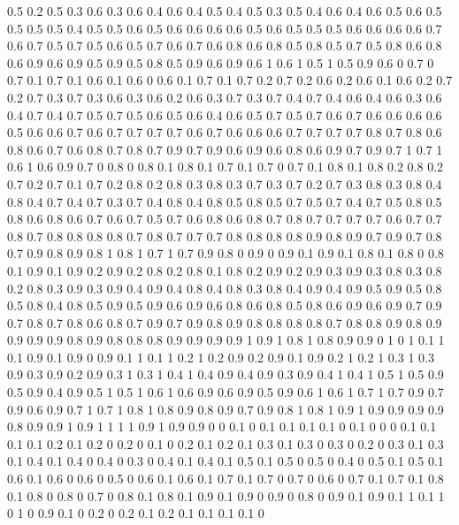 0.5 0.2
0.5 0.3
0.6 0.3
0.6 0.4
0.6 0.4
0.5 0.4
0.5 0.3
0.5 0.4
0.6 0.4
0.6 0.5
0.6 0.5
0.5 0.5
0.5 0.4
0.5 0.5
0.6 0.5
0.6 0.6
0.6 0.6
0.5 0.6
0.5 0.5
0.5 0.6
0.6 0.6
0.6 0.7
0.6 0.7
0.5 0.7
0.5 0.6
0.5 0.7
0.6 0.7
0.6 0.8
0.6 0.8
0.5 0.8
0.5 0.7
0.5 0.8
0.6 0.8
0.6 0.9
0.6 0.9
0.5 0.9
0.5 0.8
0.5 0.9
0.6 0.9
0.6 1
0.6 1
0.5 1
0.5 0.9
0.6 0
0.7 0
0.7 0.1
0.7 0.1
0.6 0.1
0.6 0
0.6 0.1
0.7 0.1
0.7 0.2
0.7 0.2
0.6 0.2
0.6 0.1
0.6 0.2
0.7 0.2
0.7 0.3
0.7 0.3
0.6 0.3
0.6 0.2
0.6 0.3
0.7 0.3
0.7 0.4
0.7 0.4
0.6 0.4
0.6 0.3
0.6 0.4
0.7 0.4
0.7 0.5
0.7 0.5
0.6 0.5
0.6 0.4
0.6 0.5
0.7 0.5
0.7 0.6
0.7 0.6
0.6 0.6
0.6 0.5
0.6 0.6
0.7 0.6
0.7 0.7
0.7 0.7
0.6 0.7
0.6 0.6
0.6 0.7
0.7 0.7
0.7 0.8
0.7 0.8
0.6 0.8
0.6 0.7
0.6 0.8
0.7 0.8
0.7 0.9
0.7 0.9
0.6 0.9
0.6 0.8
0.6 0.9
0.7 0.9
0.7 1
0.7 1
0.6 1
0.6 0.9
0.7 0
0.8 0
0.8 0.1
0.8 0.1
0.7 0.1
0.7 0
0.7 0.1
0.8 0.1
0.8 0.2
0.8 0.2
0.7 0.2
0.7 0.1
0.7 0.2
0.8 0.2
0.8 0.3
0.8 0.3
0.7 0.3
0.7 0.2
0.7 0.3
0.8 0.3
0.8 0.4
0.8 0.4
0.7 0.4
0.7 0.3
0.7 0.4
0.8 0.4
0.8 0.5
0.8 0.5
0.7 0.5
0.7 0.4
0.7 0.5
0.8 0.5
0.8 0.6
0.8 0.6
0.7 0.6
0.7 0.5
0.7 0.6
0.8 0.6
0.8 0.7
0.8 0.7
0.7 0.7
0.7 0.6
0.7 0.7
0.8 0.7
0.8 0.8
0.8 0.8
0.7 0.8
0.7 0.7
0.7 0.8
0.8 0.8
0.8 0.9
0.8 0.9
0.7 0.9
0.7 0.8
0.7 0.9
0.8 0.9
0.8 1
0.8 1
0.7 1
0.7 0.9
0.8 0
0.9 0
0.9 0.1
0.9 0.1
0.8 0.1
0.8 0
0.8 0.1
0.9 0.1
0.9 0.2
0.9 0.2
0.8 0.2
0.8 0.1
0.8 0.2
0.9 0.2
0.9 0.3
0.9 0.3
0.8 0.3
0.8 0.2
0.8 0.3
0.9 0.3
0.9 0.4
0.9 0.4
0.8 0.4
0.8 0.3
0.8 0.4
0.9 0.4
0.9 0.5
0.9 0.5
0.8 0.5
0.8 0.4
0.8 0.5
0.9 0.5
0.9 0.6
0.9 0.6
0.8 0.6
0.8 0.5
0.8 0.6
0.9 0.6
0.9 0.7
0.9 0.7
0.8 0.7
0.8 0.6
0.8 0.7
0.9 0.7
0.9 0.8
0.9 0.8
0.8 0.8
0.8 0.7
0.8 0.8
0.9 0.8
0.9 0.9
0.9 0.9
0.8 0.9
0.8 0.8
0.8 0.9
0.9 0.9
0.9 1
0.9 1
0.8 1
0.8 0.9
0.9 0
1 0
1 0.1
1 0.1
0.9 0.1
0.9 0
0.9 0.1
1 0.1
1 0.2
1 0.2
0.9 0.2
0.9 0.1
0.9 0.2
1 0.2
1 0.3
1 0.3
0.9 0.3
0.9 0.2
0.9 0.3
1 0.3
1 0.4
1 0.4
0.9 0.4
0.9 0.3
0.9 0.4
1 0.4
1 0.5
1 0.5
0.9 0.5
0.9 0.4
0.9 0.5
1 0.5
1 0.6
1 0.6
0.9 0.6
0.9 0.5
0.9 0.6
1 0.6
1 0.7
1 0.7
0.9 0.7
0.9 0.6
0.9 0.7
1 0.7
1 0.8
1 0.8
0.9 0.8
0.9 0.7
0.9 0.8
1 0.8
1 0.9
1 0.9
0.9 0.9
0.9 0.8
0.9 0.9
1 0.9
1 1
1 1
0.9 1
0.9 0.9
0 0
0.1 0
0.1 0.1
0.1 0.1
0 0.1
0 0
0 0.1
0.1 0.1
0.1 0.2
0.1 0.2
0 0.2
0 0.1
0 0.2
0.1 0.2
0.1 0.3
0.1 0.3
0 0.3
0 0.2
0 0.3
0.1 0.3
0.1 0.4
0.1 0.4
0 0.4
0 0.3
0 0.4
0.1 0.4
0.1 0.5
0.1 0.5
0 0.5
0 0.4
0 0.5
0.1 0.5
0.1 0.6
0.1 0.6
0 0.6
0 0.5
0 0.6
0.1 0.6
0.1 0.7
0.1 0.7
0 0.7
0 0.6
0 0.7
0.1 0.7
0.1 0.8
0.1 0.8
0 0.8
0 0.7
0 0.8
0.1 0.8
0.1 0.9
0.1 0.9
0 0.9
0 0.8
0 0.9
0.1 0.9
0.1 1
0.1 1
0 1
0 0.9
0.1 0
0.2 0
0.2 0.1
0.2 0.1
0.1 0.1
0.1 0
